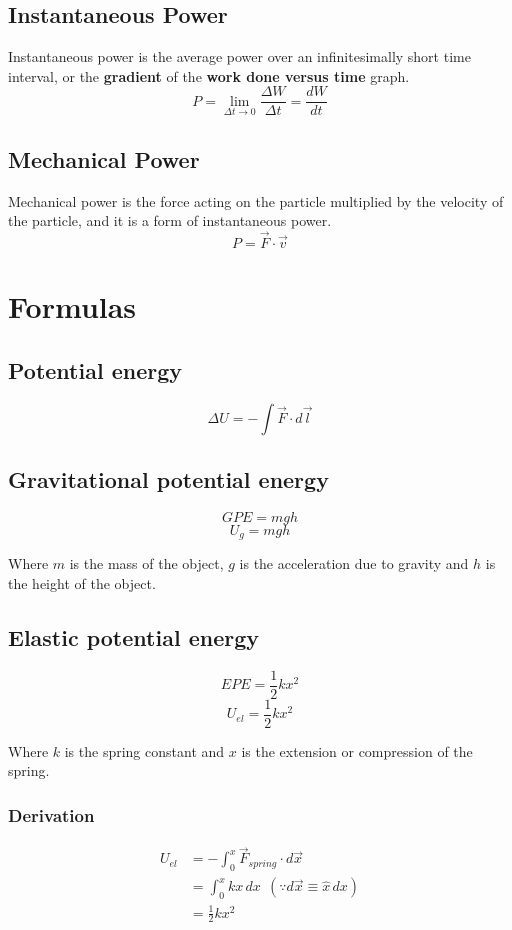 \documentclass[11pt]{article}
\begin{document}
\subsection{Instantaneous Power}
\label{sec:orgb78d6c6}
Instantaneous power is the average power over an infinitesimally short time interval, or the \textbf{gradient} of the \textbf{work done versus time} graph.
\[P = \lim_{\Delta t \rightarrow 0} \frac{\Delta W}{\Delta t} = \frac{dW}{dt}\]

\subsection{Mechanical Power}
\label{sec:org2541ed5}
Mechanical power is the force acting on the particle multiplied by the velocity of the particle, and it is a form of instantaneous power.
\[P = \vec{F} \cdot \vec{v}\]

\section{Formulas}
\label{sec:org16ab3fb}

\subsection{Potential energy}
\label{sec:org3ce77d8}
\[\Delta U = - \int \vec{F} \cdot d \vec{l}\]

\subsection{Gravitational potential energy}
\label{sec:org8cee132}
\[GPE = mgh\]
\[U_{g} = mgh\]

Where \(m\) is the mass of the object, \(g\) is the acceleration due to gravity and \(h\) is the height of the object.

\subsection{Elastic potential energy}
\label{sec:org2f8355d}
\[EPE = \frac{1}{2}kx^2\]
\[U_{el} = \frac{1}{2}kx^2\]

Where \(k\) is the spring constant and \(x\) is the extension or compression of the spring.

\subsubsection{Derivation}
\label{sec:orge67ba00}
\begin{align*}
U_{el} &= - \int_0^x \vec{F}_{spring} \cdot d \vec{x} \\
&= \int_0^x kx \, dx \ \ (\because d \vec{x} \equiv \hat{x} \, dx ) \\
&= \frac{1}{2}kx^2
\end{align*}
\end{document}
